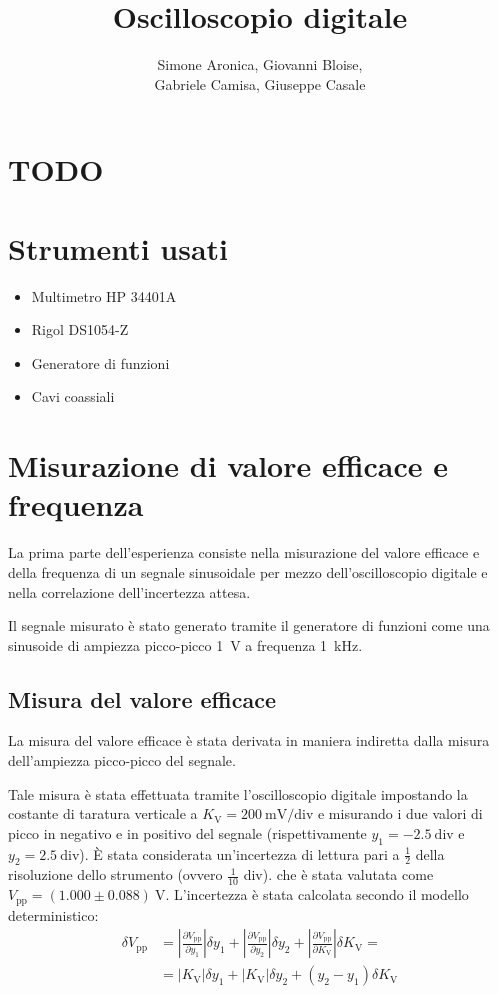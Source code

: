 \documentclass{article}
\title{Oscilloscopio digitale}
\author{Simone Aronica, Giovanni Bloise, \\
Gabriele Camisa, Giuseppe Casale}
\begin{document}
\maketitle
\tableofcontents
\pagebreak

\section*{TODO}

\section{Strumenti usati}
\begin{itemize}
    \item Multimetro HP 34401A
    \item Rigol DS1054-Z
    \item Generatore di funzioni
    \item Cavi coassiali
\end{itemize}

\section{Misurazione di valore efficace e frequenza}
La prima parte dell'esperienza consiste nella misurazione del valore efficace e della frequenza di un segnale sinusoidale
per mezzo dell'oscilloscopio digitale e nella correlazione dell'incertezza attesa. 

Il segnale misurato è stato generato tramite il generatore di funzioni come una sinusoide di ampiezza picco-picco \SI{1}{\volt} a frequenza \SI{1}{\kilo\hertz}.

\subsection{Misura del valore efficace}
La misura del valore efficace è stata derivata in maniera indiretta dalla misura dell'ampiezza picco-picco del segnale. 

Tale misura è stata effettuata tramite l'oscilloscopio digitale impostando la costante di taratura verticale a $K_{\text{V}} = \SI{200}{\milli\volt}/\text{div}$ e misurando i due valori di picco in negativo e in positivo del segnale 
(rispettivamente $y_1 = -2.5\ \text{div} $ e $y_2 = 2.5\ \text{div}$). È stata considerata un'incertezza di lettura pari a $\frac{1}{2}$ della risoluzione dello strumento (ovvero $\frac{1}{10}$ div).
che è stata valutata come 
$V_{\text{pp}}=(1.000\pm0.088)\SI{}{\volt}$. L'incertezza è stata calcolata secondo il modello deterministico:
\begin{equation*}
    \begin{split}
        \delta V_{\text{pp}}&=\left|\frac{\partial V_{\text{pp}}}{\partial y_1}\right|\delta y_1+\left|\frac{\partial V_{\text{pp}}}{\partial y_2}\right|\delta y_2+\left|\frac{\partial V_{\text{pp}}}{\partial K_{\text{V}}}\right|\delta K_{\text{V}}=\\
        &=\left|K_{\text{V}}\right|\delta y_1 + \left|K_{\text{V}}\right|\delta y_2 + (y_2 - y_1)\delta K_{\text{V}}
    \end{split}
\end{equation*}
\end{document}
